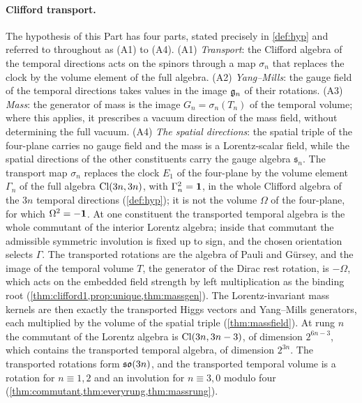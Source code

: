 \paragraph{Clifford transport.} The hypothesis of this Part has four parts, stated precisely in \cref{def:hyp} and referred to
throughout as (A1) to (A4). (A1) \emph{Transport}: the Clifford algebra of the temporal directions acts on the spinors through a map
$\sigma_n$ that replaces the clock by the volume element of the full algebra. (A2) \emph{Yang--Mills}: the gauge field of the temporal
directions takes values in the image $\mathfrak g_n$ of their rotations. (A3) \emph{Mass}: the generator of mass is the image $G_n=\sigma_n(T_n)$ of
the temporal volume; where this applies, it prescribes a vacuum direction of the mass field, without determining the full vacuum. (A4) \emph{The spatial directions}: the spatial triple of the four-plane
carries no gauge field and the mass is a Lorentz-scalar field, while the spatial directions of the other constituents carry the gauge
algebra $\mathfrak s_n$. The transport map $\sigma_n$ replaces the clock $E_1$ of the four-plane by the volume element $\Gamma_n$ of the
full algebra $\mathrm{Cl}(3n,3n)$, with $\Gamma_n^2=\mathbf 1$, in the whole Clifford algebra of the $3n$ temporal directions (\cref{def:hyp}); it is not the
volume $\Omega$ of the four-plane, for which $\Omega^2=-\mathbf 1$. At one constituent the transported temporal algebra is the whole commutant of the
interior Lorentz algebra; inside that commutant the admissible symmetric involution is fixed up to sign, and the chosen orientation
selects $\Gamma$. The transported rotations are the algebra of
Pauli and G\"ursey, and the image of the temporal volume $T$, the generator of the Dirac rest rotation, is $-\Omega$, which acts on the
embedded field strength by left multiplication as the binding root (\cref{thm:clifford1,prop:unique,thm:massgen}). The Lorentz-invariant mass
kernels are then exactly the transported Higgs vectors and Yang--Mills generators, each multiplied by the volume of the spatial triple
(\cref{thm:massfield}). At rung $n$ the commutant of the Lorentz algebra is $\mathrm{Cl}(3n,3n-3)$, of dimension $2^{6n-3}$, which contains the
transported temporal algebra, of dimension $2^{3n}$. The transported rotations form $\mathfrak{so}(3n)$, and the transported temporal volume is a
rotation for $n\equiv1,2$ and an involution for $n\equiv3,0$ modulo four (\cref{thm:commutant,thm:everyrung,thm:massrung}).

